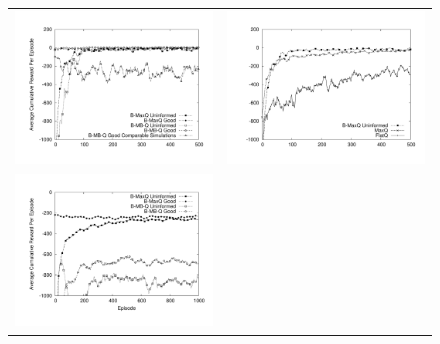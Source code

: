 \renewcommand{\arraystretch}{0}
\begin{figure}[ht]
\centering
\begin{tabular}{cc}
\includegraphics[trim=50 50 30 50, clip, scale=0.3]{exp/Taxib.pdf} & 
\includegraphics[trim=50 50 30 50, clip, scale=0.3]{exp/Taxinb.pdf} \\
\includegraphics[trim=50 50 30 50, clip, scale=0.3]{exp/Wargus3322b.pdf} & 

\end{tabular}
\end{figure}
